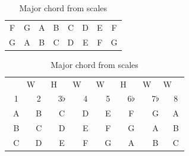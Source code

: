 \begin{table}[h]
\begin{minipage}{0.45\textwidth}
\begin{tabular}{*{16}{c}}
			\multicolumn{2}{P{4mm}}{\ScaleRootCellFill F} & \multicolumn{2}{P{4mm}}{G} & \multicolumn{2}{P{4mm}}{\ScaleCellFill A} & \multicolumn{2}{P{4mm}}{B\flat} & \multicolumn{2}{P{4mm}}{\ScaleCellFill C} & \multicolumn{2}{P{4mm}}{D} & \multicolumn{2}{P{4mm}}{E} & \multicolumn{2}{P{4mm}}{F} \\
			\multicolumn{2}{P{4mm}}{\ScaleRootCellFill G} & \multicolumn{2}{P{4mm}}{A} & \multicolumn{2}{P{4mm}}{\ScaleCellFill B} & \multicolumn{2}{P{4mm}}{C} & \multicolumn{2}{P{4mm}}{\ScaleCellFill D} & \multicolumn{2}{P{4mm}}{E} & \multicolumn{2}{P{4mm}}{F\sharp} & \multicolumn{2}{P{4mm}}{G} \\
		\end{tabular}
		\caption{Major chord from scales}
		\label{tab:guitar_major_chords_from_scales}
	\end{minipage}
	\hfill
	\begin{minipage}{0.45\textwidth}
		\centering
		\begin{tabular}{*{16}{c}}
			& \multicolumn{2}{P{4mm}}{\large{W}} & \multicolumn{2}{P{4mm}}{\large{H}} & \multicolumn{2}{P{4mm}}{\large{W}} & \multicolumn{2}{P{4mm}}{\large{W}} & \multicolumn{2}{P{4mm}}{\large{H}} & \multicolumn{2}{P{4mm}}{\large{W}} & \multicolumn{2}{P{4mm}}{\large{W}} & \\
			\multicolumn{2}{P{4mm}}{1} & \multicolumn{2}{P{4mm}}{2} & \multicolumn{2}{P{4mm}}{3$\flat$} & \multicolumn{2}{P{4mm}}{4} & \multicolumn{2}{P{4mm}}{5} & \multicolumn{2}{P{4mm}}{6$\flat$} & \multicolumn{2}{P{4mm}}{7$\flat$} & \multicolumn{2}{P{4mm}}{8} \\
			\multicolumn{2}{P{4mm}}{\ScaleRootCellFill A} & \multicolumn{2}{P{4mm}}{B} & \multicolumn{2}{P{4mm}}{\ScaleCellFill C} & \multicolumn{2}{P{4mm}}{D} & \multicolumn{2}{P{4mm}}{\ScaleCellFill E} & \multicolumn{2}{P{4mm}}{F} & \multicolumn{2}{P{4mm}}{G} & \multicolumn{2}{P{4mm}}{A} \\
			\multicolumn{2}{P{4mm}}{\ScaleRootCellFill B} & \multicolumn{2}{P{4mm}}{C\sharp} & \multicolumn{2}{P{4mm}}{\ScaleCellFill D} & \multicolumn{2}{P{4mm}}{E} & \multicolumn{2}{P{4mm}}{\ScaleCellFill F\sharp} & \multicolumn{2}{P{4mm}}{G} & \multicolumn{2}{P{4mm}}{A} & \multicolumn{2}{P{4mm}}{B} \\
			\multicolumn{2}{P{4mm}}{\ScaleRootCellFill C} & \multicolumn{2}{P{4mm}}{D} & \multicolumn{2}{P{4mm}}{\ScaleCellFill E\flat} & \multicolumn{2}{P{4mm}}{F} & \multicolumn{2}{P{4mm}}{\ScaleCellFill G} & \multicolumn{2}{P{4mm}}{A\flat} & \multicolumn{2}{P{4mm}}{B\flat} & \multicolumn{2}{P{4mm}}{C} \\

\end{tabular}
\end{minipage}
\end{table}
